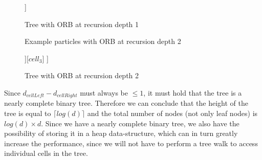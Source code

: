 \documentclass[]{article}
\begin{document}
\begin{figure}[H]
\centering
	\begin{forest}
		[$cell_1$
		[$cell_2$][$cell_3$]  
		]
	\end{forest}    
\caption{Tree with ORB at recursion depth 1}
\end{figure}

\begin{figure}[H]
	\begin{center}
    \end{center}
\caption{Example particles with ORB at recursion depth 2}
\end{figure}

\begin{figure}[H]
	\centering
	\begin{forest}
		[$cell_1$
		[$cell_2$ [$cell_4$] [$cell_5$]][$cell_3$]  
		]
	\end{forest}
 \caption{Tree with ORB at recursion depth 2}
\end{figure}


Since $d_{cellLeft} - d_{cellRight}$ must always be $\leq 1$, it must hold that the tree is a nearly complete binary tree. Therefore we can conclude that the height of the tree is equal to $\lceil log(d) \rceil$ and the total number of nodes (not only leaf nodes) is $log(d) \times d$. Since we have a nearly complete binary tree, we also have the possibility of storing it in a heap data-structure, which can in turn greatly increase the performance, since we will not have to perform a tree walk to access individual cells in the tree.
\end{document}
